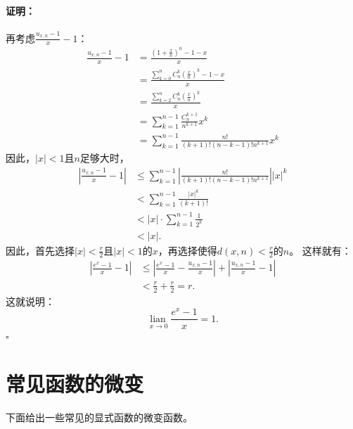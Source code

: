 \documentclass[12pt,UTF8]{ctexbook}
\newcommand{\lian}[1]{
    \underset{#1}{\operatorname{lian}\,}
}
\theoremstyle{definition}
\theoremstyle{plain}
\renewenvironment{proof}{\paragraph{\textbf{证明：}}}{\hfill$\square$}
\begin{document}
\begin{appendix}
\begin{proof}
    再考虑$\frac{u_{x,n} - 1}{x} - 1$：
    \begin{align*}
        \frac{u_{x,n} - 1}{x} - 1 &= \frac{\left(1 + \frac{x}{n}\right)^{n} - 1 - x}{x}  \\
        &= \frac{\sum_{k=0}^n C_n^k \left(\frac{x}{n}\right)^k - 1 - x}{x}  \\
        &= \frac{\sum_{k=2}^n C_n^k \left(\frac{x}{n}\right)^k}{x}  \\
        &= \sum_{k=1}^{n-1} \frac{C_n^{k+1}}{n^{k+1}} x^k  \\
        &= \sum_{k=1}^{n-1} \frac{n!}{(k+1)!(n-k-1)!n^{k+1}} x^k  
    \end{align*}
    因此，$|x|<1$且$n$足够大时，
    \begin{align*}
        \left| \frac{u_{x,n} - 1}{x} - 1 \right| &\leqslant \sum_{k=1}^{n-1} \left|\frac{n!}{(k+1)!(n-k-1)!n^{k+1}}\right| |x|^k  \\
        &< \sum_{k=1}^{n-1} \frac{|x|^k}{(k+1)!}  \\
        &< |x| \cdot \sum_{k=1}^{n-1} \frac{1}{2^k}  \\
        &< |x|.  
    \end{align*}
    因此，首先选择$|x| < \frac{r}{2}$且$|x|<1$的$x$，再选择使得$d(x, n) < \frac{r}{2}$的$n$。
    这样就有：
    \begin{align*}
        \left|\frac{e^x - 1}{x} - 1\right| &\leqslant \left|\frac{e^x - 1}{x} - \frac{u_{x,n} - 1}{x}\right| + \left|\frac{u_{x,n} - 1}{x} - 1\right|  \\
        &< \frac{r}{2} + \frac{r}{2} = r.   
    \end{align*}
    这就说明：
    $$\lian{x\to 0} \frac{e^x - 1}{x} = 1.$$
\end{proof}

\section{常见函数的微变}

下面给出一些常见的显式函数的微变函数。


\end{appendix}
\end{document}
